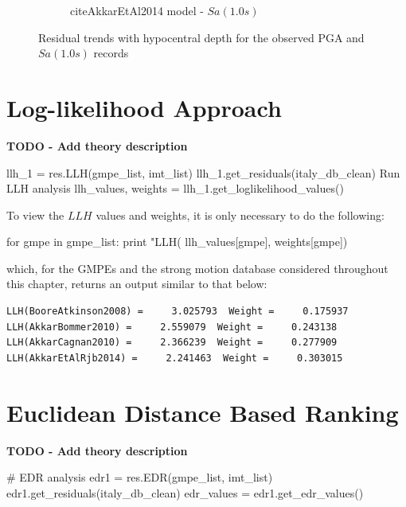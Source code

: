\begin{figure}[htb]
\begin{subfigure}[b]{0.49\textwidth}
     \caption{citeAkkarEtAl2014 model - $Sa \left( {1.0 s} \right)$}
      \label{fig:sa1_depth_akkar2014}
  \end{subfigure}
  \caption{Residual trends with hypocentral depth for the observed PGA and $Sa \left( {1.0 s} \right)$ records}
  \label{fig:depth_resid}
\end{figure}

\section{Log-likelihood Approach}
\label{sec:llh}

\textbf{TODO - Add theory description}

\begin{python}[frame=single]
llh_1 = res.LLH(gmpe_list, imt_list)
llh_1.get_residuals(italy_db_clean)
 Run LLH analysis
llh_values, weights = llh_1.get_loglikelihood_values()
\end{python}

To view the $LLH$ values and weights, it is only necessary to do the following:

\begin{python}
for gmpe in gmpe_list:
    print "LLH(%
                                               llh_values[gmpe],     
                                               weights[gmpe])
\end{python}

\noindent which, for the GMPEs and the strong motion database considered throughout this chapter, returns an output similar to that below:

\begin{verbatim}
LLH(BooreAtkinson2008) =     3.025793  Weight =     0.175937
LLH(AkkarBommer2010) =     2.559079  Weight =     0.243138
LLH(AkkarCagnan2010) =     2.366239  Weight =     0.277909
LLH(AkkarEtAlRjb2014) =     2.241463  Weight =     0.303015
\end{verbatim}


\section{Euclidean Distance Based Ranking}
\label{sec:edr}

\textbf{TODO - Add theory description}

\begin{python}[frame=single]
# EDR analysis
edr1 = res.EDR(gmpe_list, imt_list)
edr1.get_residuals(italy_db_clean)
edr_values = edr1.get_edr_values()
\end{python}

